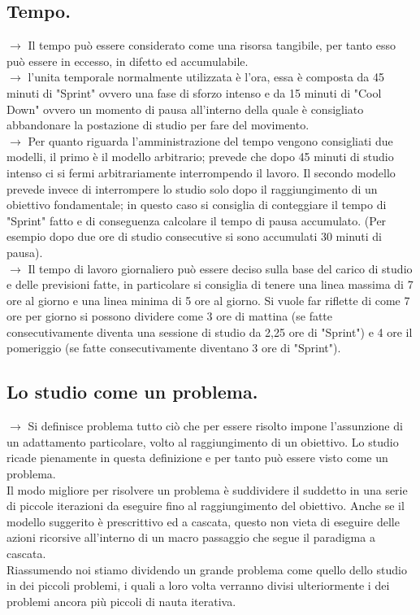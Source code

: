 \documentclass[11pt,a4paper]{article}
\begin{document}
\subsection{Tempo.}
$\rightarrow$ Il tempo può essere considerato come una risorsa tangibile, per tanto esso può essere in eccesso, in difetto ed accumulabile.\\
$\rightarrow$ l'unita temporale normalmente utilizzata è l'ora, essa è composta da 45 minuti di "Sprint" ovvero una fase di sforzo intenso e da 15 minuti di "Cool Down" ovvero un momento di pausa all'interno della quale è consigliato abbandonare la postazione di studio per fare del movimento. \\
$\rightarrow$ Per quanto riguarda l'amministrazione del tempo vengono consigliati due modelli, il primo è il  modello arbitrario; prevede che dopo 45 minuti di studio intenso ci si fermi arbitrariamente interrompendo il lavoro. Il secondo modello prevede invece di interrompere lo studio solo dopo il raggiungimento di un obiettivo fondamentale; in questo caso si consiglia di conteggiare il tempo di "Sprint" fatto e di conseguenza calcolare il tempo di pausa accumulato. (Per esempio dopo due ore di studio consecutive si sono accumulati 30 minuti di pausa).\\
$\rightarrow$ Il tempo di lavoro giornaliero può essere deciso sulla base del carico di studio e delle previsioni fatte, in particolare si consiglia di tenere una linea massima di 7 ore al giorno e una linea minima di 5 ore al giorno. Si vuole far riflette di come 7 ore per giorno si possono dividere come 3 ore di mattina (se fatte consecutivamente diventa una sessione di studio da 2,25 ore di "Sprint") e 4 ore il pomeriggio (se fatte consecutivamente diventano 3 ore di "Sprint").\\

\subsection{Lo studio come un problema.} 
$\rightarrow$ Si definisce problema tutto ciò che per essere risolto impone l'assunzione di un adattamento particolare, volto al raggiungimento di un obiettivo. Lo studio ricade pienamente in questa definizione e per tanto può essere visto come un problema.\\
Il modo migliore per risolvere un problema è suddividere il suddetto in una serie di piccole iterazioni da eseguire fino al raggiungimento del obiettivo. Anche se il modello suggerito è prescrittivo ed a cascata, questo non vieta di eseguire delle azioni ricorsive all'interno di un macro passaggio che segue il paradigma a cascata.\\
Riassumendo noi stiamo dividendo un grande problema come quello dello studio in dei piccoli problemi, i quali a loro volta verranno divisi ulteriormente i dei problemi ancora più piccoli di nauta iterativa.\\ 
\end{document}
